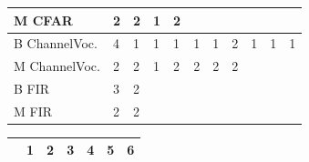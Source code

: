 \begin{table}[t]
{\begin{minipage}{0.5\textwidth}
\begin{tabular} { | l | l | l | l | l | l | l | l | l | l |l| }
    M CFAR & 2 & 2  & 1  & 2 & \cellcolor[gray]{0.3}& \cellcolor[gray]{0.3}& \cellcolor[gray]{0.3}& \cellcolor[gray]{0.3}& \cellcolor[gray]{0.3}& \cellcolor[gray]{0.3} \\ \hline\hline
    B ChannelVoc.& 4 & 1 & 1 & 1 & 1 & 1 & 2 & 1 & 1 & 1 \\ \hline 
    M ChannelVoc.& 2 & 2 & 1 & 2 & 2& 2 & 2& \cellcolor[gray]{0.3}& \cellcolor[gray]{0.3}& \cellcolor[gray]{0.3} \\ \hline\hline
    B FIR & 3 & 2 &\cellcolor[gray]{0.3}&\cellcolor[gray]{0.3}&\cellcolor[gray]{0.3}&\cellcolor[gray]{0.3}&\cellcolor[gray]{0.3}&\cellcolor[gray]{0.3}&\cellcolor[gray]{0.3}&\cellcolor[gray]{0.3}\\ \hline
    M FIR & 2 & 2&\cellcolor[gray]{0.3}&\cellcolor[gray]{0.3}&\cellcolor[gray]{0.3}&\cellcolor[gray]{0.3}&\cellcolor[gray]{0.3}&\cellcolor[gray]{0.3}&\cellcolor[gray]{0.3}&\cellcolor[gray]{0.3}\\ \hline\hline
    \end{tabular}
  \end{minipage}	\hfill
  \hspace{1em}
\begin{minipage}{0.5\textwidth}

	 \begin{tabular} { | l | l | l | l | l | l | l |}
    \hline
      & \textbf{1} & \textbf{2} & \textbf{3} & \textbf{4} & \textbf{5} & \textbf{6}  \\ \hline


\end{tabular}
\end{minipage}}
\end{table}
